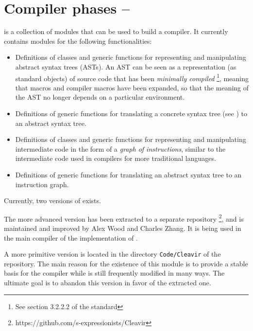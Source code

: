 \chapter{Compiler phases -- \cleavir{}}

\cleavir{} is a collection of modules that can be used to build a
\commonlisp{} compiler.  It currently contains modules for the
following functionalities:

\begin{itemize}
\item Definitions of classes and generic functions for representing
  and manipulating abstract syntax trees (ASTs).  An AST can be seen
  as a representation (as standard objects) of source code that has
  been \emph{minimally compiled}%
  \footnote{See section 3.2.2.2 of the \commonlisp{} standard},
  meaning that macros and compiler macros have been expanded, so that
  the meaning of the AST no longer depends on a particular
  environment.
\item Definitions of generic functions for translating a concrete
  syntax tree (see ) to an abstract
  syntax tree.
\item Definitions of classes and generic functions for representing
  and manipulating intermediate code in the form of a \emph{graph of
    instructions}, similar to the intermediate code used in compilers
  for more traditional languages.
\item Definitions of generic functions for translating an abstract
  syntax tree to an instruction graph.
\end{itemize}

Currently, two versions of \cleavir{} exists.

The more advanced version has been extracted to a separate repository%
\footnote{https://github.com/s-expressionists/Cleavir}, and is
maintained and improved by Alex Wood and Charles Zhang.  It is being
used in the main compiler of the \clasp{} implementation of
\commonlisp{}.

A more primitive version is located in the directory
\texttt{Code/Cleavir} of the \sysname{} repository.  The main reason
for the existence of this module is to provide a stable basis for the
\sysname{} compiler while \sysname{} is still frequently modified in
many ways.  The ultimate goal is to abandon this version in favor of
the extracted one.
